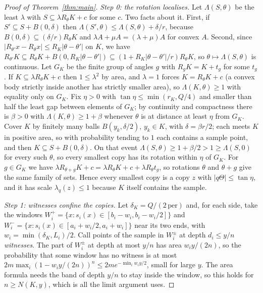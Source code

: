 \documentclass[11pt]{amsart}
\theoremstyle{remark}\newtheorem{remark}[theorem]{Remark}
\begin{document}
\begin{proof}[Proof of Theorem~\ref{thm:main}]
\emph{Step 0: the rotation localises.} Let $\Lambda(S,\theta)$ be the least $\lambda$ with $S\subseteq\lambda
R_\theta K+c$ for some $c$. Two facts about it. First, if $S'\subseteq S+B(0,\delta)$ then
$\Lambda(S',\theta)\le\Lambda(S,\theta)+\delta/r$, because $B(0,\delta)\subseteq(\delta/r)R_\theta K$ and $\lambda
A+\mu A=(\lambda+\mu)A$ for convex $A$. Second, since $|R_{\theta'}x-R_\theta x|\le R_K|\theta-\theta'|$ on $K$, we have
$R_{\theta'}K\subseteq R_\theta K+B(0,R_K|\theta-\theta'|)\subseteq(1+R_K|\theta-\theta'|/r)R_\theta K$, so
$\theta\mapsto\Lambda(S,\theta)$ is continuous. Let $G_K$ be the finite group of angles $g$ with $R_gK=K+t_g$ for some
$t_g$. If $K\subseteq\lambda R_\theta K+c$ then $1\le\lambda^2$ by area, and $\lambda=1$ forces $K=R_\theta K+c$ (a
convex body strictly inside another has strictly smaller area), so $\Lambda(K,\theta)\ge1$ with equality only on
$G_K$. Fix $\eta>0$ with $\tan\eta\le\min(r_K,Q/4)$ and smaller than half the least gap between elements of $G_K$; by
continuity and compactness there is $\beta>0$ with $\Lambda(K,\theta)\ge1+\beta$ whenever $\theta$ is at distance at
least $\eta$ from $G_K$. Cover $K$ by finitely many balls $B(y_k,\delta/2)$, $y_k\in K$, with $\delta=\beta r/2$; each
meets $K$ in positive area, so with probability tending to $1$ each contains a sample point, and then $K\subseteq
S+B(0,\delta)$. On that event $\Lambda(S,\theta)\ge1+\beta/2>1\ge\Lambda(S,0)$ for every such $\theta$, so every
smallest copy has its rotation within $\eta$ of $G_K$. For $g\in G_K$ we have $\lambda R_{\theta+g}K+c=\lambda
R_\theta K+c+\lambda R_\theta t_g$, so rotations $\theta$ and $\theta+g$ give the same family of sets. Hence every
smallest copy is a copy $z$ with $|q\Theta|\le\tan\eta$, and it has scale $\lambda_q(z)\le1$ because $K$ itself
contains the sample.

\emph{Step 1: witnesses confine the copies.} Let $\delta_K=Q/(2\,\mathrm{per})$ and, for each side, take the windows
$W_i^+=\{x:s_i(x)\in[b_i-w_i,b_i-w_i/2]\}$ and $W_i^-=\{x:s_i(x)\in[a_i+w_i/2,a_i+w_i]\}$ near its two ends, with
$w_i=\min(\delta_K,L_i)/2$. Call points of the sample in $W_i^\pm$ at depth $d_i\le y/n$ \emph{witnesses}. The part of
$W_i^\pm$ at depth at most $y/n$ has area $w_iy/(2n)$, so the probability that some window has no witness is at most
$2m\max_i(1-w_iy/(2n))^n\le2me^{-\min_iw_iy/2}$, small for large $y$. The area formula needs the band of depth
$y/n$ to stay inside the window, so this holds for $n\ge N(K,y)$, which is all the limit argument uses.


\end{proof}
\end{document}
